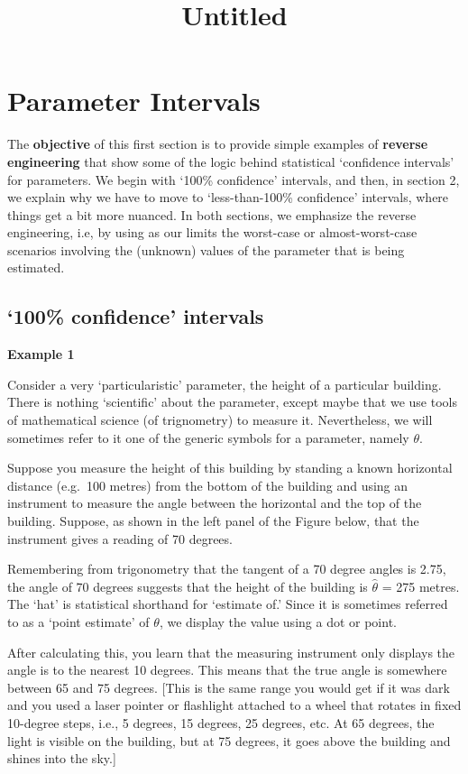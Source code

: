 \documentclass[
]{article}
\title{Untitled}
\author{}
\date{\vspace{-2.5em}}
\begin{document}
\maketitle

\hypertarget{CI}{%
\section{Parameter Intervals}\label{CI}}

The \textbf{objective} of this first section is to provide simple
examples of \textbf{reverse engineering} that show some of the logic
behind statistical `confidence intervals' for parameters. We begin with
`100\% confidence' intervals, and then, in section 2, we explain why we
have to move to `less-than-100\% confidence' intervals, where things get
a bit more nuanced. In both sections, we emphasize the reverse
engineering, i.e, by using as our limits the worst-case or
almost-worst-case scenarios involving the (unknown) values of the
parameter that is being estimated.

\hypertarget{confidence-intervals}{%
\subsection{`100\% confidence' intervals}\label{confidence-intervals}}

\textbf{Example 1}

Consider a very `particularistic' parameter, the height of a particular
building. There is nothing `scientific' about the parameter, except
maybe that we use tools of mathematical science (of trignometry) to
measure it. Nevertheless, we will sometimes refer to it one of the
generic symbols for a parameter, namely \(\theta.\)

Suppose you measure the height of this building by standing a known
horizontal distance (e.g.~100 metres) from the bottom of the building
and using an instrument to measure the angle between the horizontal and
the top of the building. Suppose, as shown in the left panel of the
Figure below, that the instrument gives a reading of 70 degrees.

Remembering from trigonometry that the tangent of a 70 degree angles is
2.75, the angle of 70 degrees suggests that the height of the building
is \(\hat{\theta}\) = 275 metres. The `hat' is statistical shorthand for
`estimate of.' Since it is sometimes referred to as a `point estimate'
of \(\theta\), we display the value using a dot or point.

After calculating this, you learn that the measuring instrument only
displays the angle is to the nearest 10 degrees. This means that the
true angle is somewhere between 65 and 75 degrees. {[}This is the same
range you would get if it was dark and you used a laser pointer or
flashlight attached to a wheel that rotates in fixed 10-degree steps,
i.e., 5 degrees, 15 degrees, 25 degrees, etc. At 65 degrees, the light
is visible on the building, but at 75 degrees, it goes above the
building and shines into the sky.{]}
\end{document}
